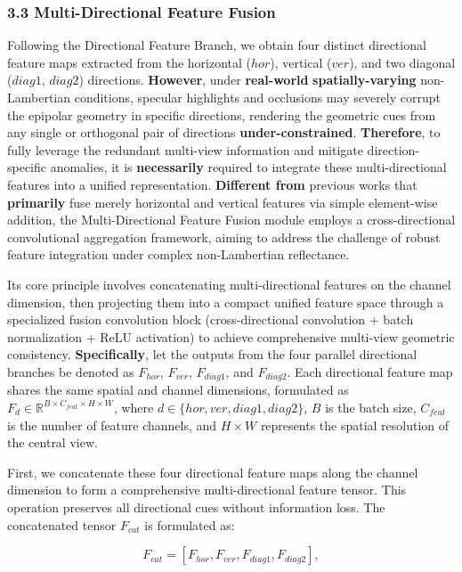 \documentclass[journal]{IEEEtran}
\begin{document}
\subsubsection{3.3 Multi-Directional Feature Fusion}

Following the Directional Feature Branch, we obtain four distinct directional feature maps extracted from the horizontal ($hor$), vertical ($ver$), and two diagonal ($diag1$, $diag2$) directions. \textbf{However}, under \textbf{real-world} \textbf{spatially-varying} non-Lambertian conditions, specular highlights and occlusions may severely corrupt the epipolar geometry in specific directions, rendering the geometric cues from any single or orthogonal pair of directions \textbf{under-constrained}. \textbf{Therefore}, to fully leverage the redundant multi-view information and mitigate direction-specific anomalies, it is \textbf{necessarily} required to integrate these multi-directional features into a unified representation. \textbf{Different from} previous works that \textbf{primarily} fuse merely horizontal and vertical features via simple element-wise addition, the Multi-Directional Feature Fusion module employs a cross-directional convolutional aggregation framework, aiming to address the challenge of robust feature integration under complex non-Lambertian reflectance.

Its core principle involves concatenating multi-directional features on the channel dimension, then projecting them into a compact unified feature space through a specialized fusion convolution block (cross-directional convolution + batch normalization + ReLU activation) to achieve comprehensive multi-view geometric consistency. \textbf{Specifically}, let the outputs from the four parallel directional branches be denoted as $F_{hor}$, $F_{ver}$, $F_{diag1}$, and $F_{diag2}$. Each directional feature map shares the same spatial and channel dimensions, formulated as $F_d \in \mathbb{R}^{B \times C_{feat} \times H \times W}$, where $d \in \{hor, ver, diag1, diag2\}$, $B$ is the batch size, $C_{feat}$ is the number of feature channels, and $H \times W$ represents the spatial resolution of the central view.

First, we concatenate these four directional feature maps along the channel dimension to form a comprehensive multi-directional feature tensor. This operation preserves all directional cues without information loss. The concatenated tensor $F_{cat}$ is formulated as:

\[
F_{cat} = [F_{hor}, F_{ver}, F_{diag1}, F_{diag2}], \tag{1}
\]
\end{document}
